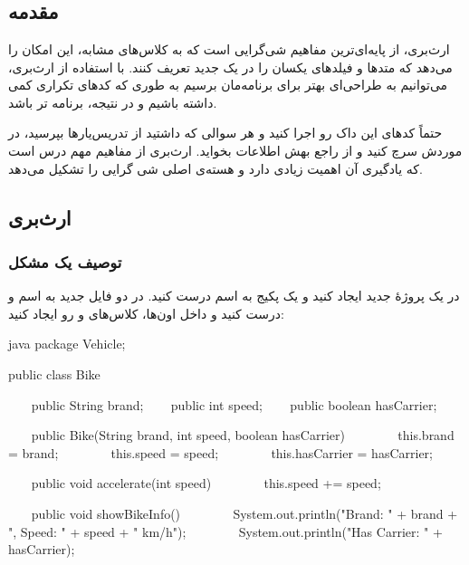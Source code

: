 \chapter{\DocTitle}
\section{مقدمه}

ارث‌بری، از پایه‌ای‌ترین مفاهیم شی‌گرایی است که به کلاس‌های مشابه، این امکان
را می‌دهد که متدها و فیلدهای یکسان را در یک  جدید تعریف کنند.
با استفاده از ارث‌بری، می‌توانیم به طراحی‌ای بهتر برای برنامه‌مان برسیم به
طوری که کدهای تکراری کمی داشته باشیم و در نتیجه، برنامه
 تر باشد.

حتماً کدهای این داک رو اجرا کنید و هر سوالی که داشتید از تدریس‌یارها
بپرسید، در موردش سرچ کنید و از  راجع بهش اطلاعات بخواید.
ارث‌بری از مفاهیم مهم درس است که یادگیری آن اهمیت زیادی دارد و هسته‌ی اصلی
شی گرایی را تشکیل می‌دهد.

\section{ارث‌بری}

\subsection{توصیف یک مشکل}

در  یک پروژهٔ جدید ایجاد کنید و یک پکیج به اسم
 درست کنید. در  دو فایل جدید
به اسم  و  درست کنید و داخل
اون‌ها، کلاس‌های  و  رو ایجاد کنید:

\begin{codebox}{java}
package Vehicle;

public class Bike {
    public String brand;
    public int speed;
    public boolean hasCarrier;

    public Bike(String brand, int speed, boolean hasCarrier) {
        this.brand = brand;
        this.speed = speed;
        this.hasCarrier = hasCarrier;  
    }

    public void accelerate(int speed) {
        this.speed += speed;  
    }

    public void showBikeInfo() {  
        System.out.println("Brand: " + brand + ", Speed: " + speed + " km/h");  
        System.out.println("Has Carrier: " + hasCarrier);  
    }  
}
\end{codebox}

